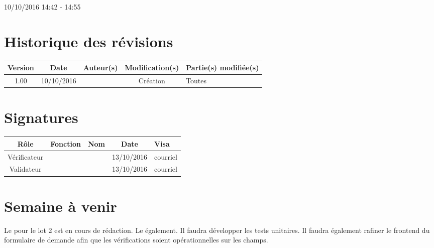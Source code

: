 \documentclass [a4paper] {article}
\begin{document}
10/10/2016			 				%
\hfill   
\hfill 	 14:42 - 14:55				%



\section*{Historique des révisions}
\begin{center}
			\begin{tabular}{| c | c | c | c | p{4cm} |}
				\hline
				\rowcolor{Gray}
				Version & Date & Auteur(s) & Modification(s) & Partie(s) modifiée(s)		 \\
				\hline
				1.00 & 10/10/2016 & \Kafui & Création & Toutes \\
		\hline		
			\end{tabular}
		\end{center}

\section*{Signatures}

		\begin{center}
			\begin{tabular}{| c | c | c | c | p{4cm} |}
				\hline
				\rowcolor{Gray}
				Rôle & Fonction & Nom & Date & Visa		 \\
				\hline
				Vérificateur & \RQ & \Melissa & 13/10/2016 & courriel \\[30pt]
				\hline
				Validateur & \CP & \Pierre & 13/10/2016 & courriel \\[30pt]	
				\hline
			\end{tabular}
		\end{center}

\section{Semaine à venir}
Le \CDR{} pour le lot 2 est en cours de rédaction. Le \PTV{} également. Il faudra développer les tests
unitaires. Il faudra également rafiner le frontend du formulaire de demande afin que les vérifications soient opérationnelles sur les champs.	




\end{document}
